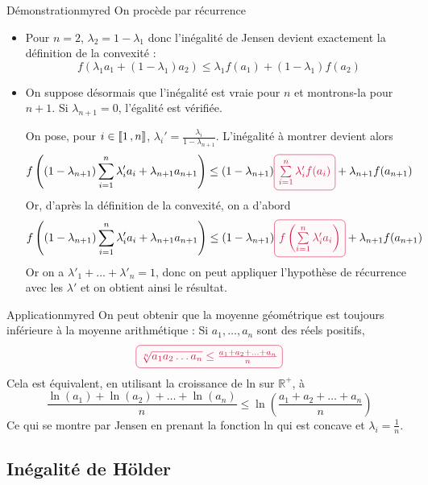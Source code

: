     \begin{demo}{Démonstration}{myred}
        On procède par récurrence 
        \begin{itemize}
            \item Pour $n = 2$, $\lambda_2 = 1 - \lambda_1$ donc l’inégalité de Jensen devient exactement la définition de la convexité : 
            \[ f(\lambda_1 a_1 + (1-\lambda_1)a_2) \leq \lambda_1 f(a_1) + (1-\lambda_1) f(a_2) \]
            \item On suppose désormais que l’inégalité est vraie pour $n$ et montrons-la pour $n+1$. Si $\lambda_{n+1} = 0$, l’égalité est vérifiée. 
    
            On pose, pour $i \in \left\llbracket 1 \, , n \right\rrbracket$, $ \lambda_i' = \frac{\lambda_i}{1 - \lambda_{n+1}}$. L’inégalité à montrer devient alors 
            \[ f\left((1-\lambda_{n+1})\sum\limits_{i=1}^n \lambda_i'a_i + \lambda_{n+1}a_{n+1}\right) \leq (1-\lambda_{n+1})\lilbox{myred}{$\sum\limits_{i=1}^n \lambda_i'f(a_i)$} + \lambda_{n+1}f(a_{n+1}) \]
            Or, d’après la définition de la convexité, on a d’abord 
            \[ f\left((1-\lambda_{n+1})\sum\limits_{i=1}^n \lambda_i'a_i + \lambda_{n+1}a_{n+1}\right) \leq (1-\lambda_{n+1})\lilbox{myred}{$f\left(\sum\limits_{i=1}^n \lambda_i'a_i\right)$} + \lambda_{n+1}f(a_{n+1}) \] 
            Or on a $\lambda'_1+\ldots+\lambda'_n=1$, donc on peut appliquer l’hypothèse de récurrence avec les $\lambda'$ et on obtient ainsi le résultat.
        \end{itemize}
    \end{demo}

    \begin{omed}{Application}{myred}
        On peut obtenir que la moyenne géométrique est toujours inférieure à la moyenne arithmétique : Si $a_1,\ldots,a_n$ sont des réels positifs, 
        \[ \lilbox{myred}{$\sqrt[n]{a_1 a_2 \ldots a_n} \leq \frac{a_1 + a_2 + \ldots + a_n}{n}$} \] 
        Cela est équivalent, en utilisant la croissance de ln sur $\mathbb{R}^+$, à 
        \[ \frac{\ln(a_1) + \ln(a_2) + \ldots + \ln(a_n)}{n} \leq \ln\left(\frac{a_1 + a_2 + \ldots + a_n}{n}\right) \]
        Ce qui se montre par Jensen en prenant la fonction ln qui est concave et $\lambda_i = \frac{1}{n}$.
    \end{omed}

\subsection{Inégalité de Hölder}

